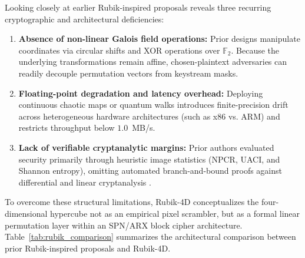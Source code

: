 \documentclass[10pt,twocolumn]{article}
\begin{document}
Looking closely at earlier Rubik-inspired proposals reveals three recurring cryptographic and architectural deficiencies:
\begin{enumerate}
    \item \textbf{Absence of non-linear Galois field operations:} Prior designs manipulate coordinates via circular shifts and XOR operations over $\mathbb{F}_2$. Because the underlying transformations remain affine, chosen-plaintext adversaries can readily decouple permutation vectors from keystream masks.
    \item \textbf{Floating-point degradation and latency overhead:} Deploying continuous chaotic maps or quantum walks introduces finite-precision drift across heterogeneous hardware architectures (such as x86 vs. ARM) and restricts throughput below $1.0$~MB/s.
    \item \textbf{Lack of verifiable cryptanalytic margins:} Prior authors evaluated security primarily through heuristic image statistics (NPCR, UACI, and Shannon entropy), omitting automated branch-and-bound proofs against differential \cite{mouha2011differential} and linear cryptanalysis \cite{matsui1993linear}.
\end{enumerate}

To overcome these structural limitations, Rubik-4D conceptualizes the four-dimensional hypercube not as an empirical pixel scrambler, but as a formal linear permutation layer within an SPN/ARX block cipher architecture. Table~\ref{tab:rubik_comparison} summarizes the architectural comparison between prior Rubik-inspired proposals and Rubik-4D.
\end{document}
